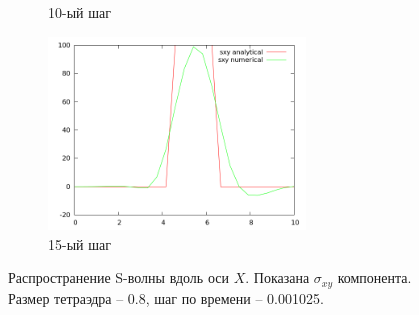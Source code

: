 \begin{figure}[H]
\begin{subfigure}[b]{0.5\textwidth}
\caption{10-ый шаг}
\end{subfigure}
\begin{subfigure}[b]{0.5\textwidth}
\centering
\includegraphics[width=0.75\textwidth]{png/veryfication/0.8/s-wave-along-x15.png}
\caption{15-ый шаг}
\end{subfigure}
\caption{Распространение S-волны вдоль оси $X$. Показана $\sigma_{xy}$ компонента. Размер тетраэдра -- 0.8, шаг по времени -- 0.001025. }
\label{pic:s_wave_along_x8}
\end{figure}

